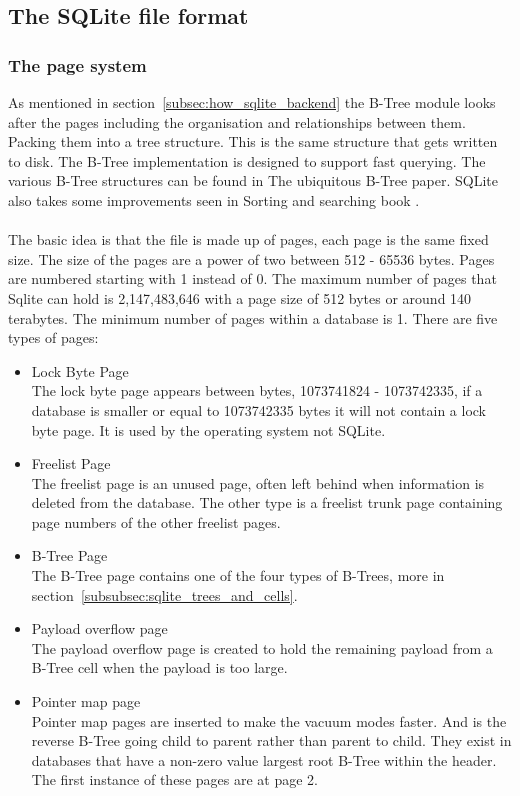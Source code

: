 \subsection{The SQLite file format}
\label{subsec:sqlite_file_format}

\subsubsection{The page system}
\label{subsubsec:sqlite_page_system}

As mentioned in section~\ref{subsec:how_sqlite_backend} the B-Tree module looks after the pages including the organisation and relationships between them. Packing them into a tree structure. This is the same structure that gets written to disk. The B-Tree implementation is designed to support fast querying. The various B-Tree structures can be found in \cite{btreepaper} The ubiquitous B-Tree paper. SQLite also takes some improvements seen in \cite{btreeimprpaper} Sorting and searching book \citep{sqliteray}.
\\\\
The basic idea is that the file is made up of pages, each page is the same fixed size. The size of the pages are a power of two between 512 - 65536 bytes. Pages are numbered starting with 1 instead of 0. The maximum number of pages that Sqlite can hold is 2,147,483,646 with a page size of 512 bytes or around 140 terabytes. The minimum number of pages within a database is 1. There are five types of pages:

\begin{itemize} 
	\item Lock Byte Page \hfill \\
		The lock byte page appears between bytes, 1073741824 - 1073742335, if a database is smaller or equal to 1073742335 bytes it will not contain a lock byte page. It is used by the operating system not SQLite.
	
	\item Freelist Page \hfill \\
		The freelist page is an unused page, often left behind when information is deleted from the database. The other type is a freelist trunk page containing page numbers of the other freelist pages.
	
	\item B-Tree Page \hfill \\
		The B-Tree page contains one of the four types of B-Trees, more in section~\ref{subsubsec:sqlite_trees_and_cells}.
	
	\item Payload overflow page \hfill \\
		The payload overflow page is created to hold the remaining payload from a B-Tree cell when the payload is too large.
	
	\item Pointer map page \hfill \\
		Pointer map pages are inserted to make the vacuum modes faster. And is the reverse B-Tree going child to parent rather than parent to child. They exist in databases that have a non-zero value largest root B-Tree within the header. The first instance of these pages are at page 2. 
\end{itemize} 

